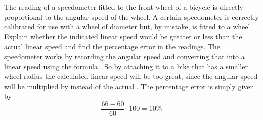 

\begin{problem}[A1984PIQ1l]
{The reading of a speedometer fitted to the front wheel of a bicycle is directly proportional to the angular speed of the wheel. A certain speedometer is correctly calibrated for use with a wheel of diameter  but, by mistake, is fitted to a  wheel. Explain whether the indicated linear speed would be greater or less than the actual linear speed and find the percentage error in the readings.
} 
{}
{The speedometer works by recording the angular speed \vari{\omega} and converting that into a linear speed using the formula \value{v}{r\omega}{}. So by attaching it to a bike that has a smaller wheel radius the calculated linear speed will be too great, since the angular speed will be multiplied by  instead of the actual . The percentage error is simply given by 
\begin{equation*} \frac{66-60}{60}\cdot100=10\% \end{equation*}
}
\end{problem}